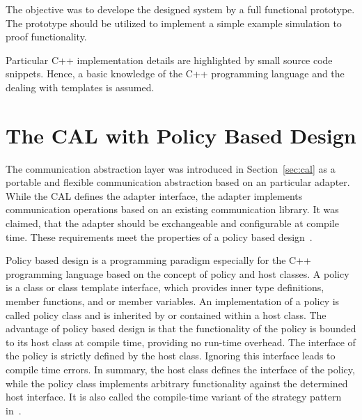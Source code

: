 The objective was to develope the designed system by a full functional prototype.
The prototype should be utilized to implement a simple example simulation
to proof functionality. 

Particular C++ implementation details are highlighted by small source
code snippets. Hence, a basic knowledge of the C++ programming
language and the dealing with templates is assumed.

\section{The CAL with Policy Based Design}

The communication abstraction layer was introduced in
Section~\ref{sec:cal} as a portable and flexible communication
abstraction based on an particular adapter. While the CAL defines the
adapter interface, the adapter implements communication operations
based on an existing communication library.  It was claimed, that the
adapter should be exchangeable and configurable at compile time. These
requirements meet the properties of a policy based
design~\cite{ref:policy_based_design}.

Policy based design is a programming paradigm especially for the C++
programming language based on the concept of policy and host classes.
A policy is a class or class template interface, which provides inner
type definitions, member functions, and or member variables. An
implementation of a policy is called policy class and is inherited by
or contained within a host class.  The advantage of policy based
design is that the functionality of the policy is bounded to its host
class at compile time, providing no run-time overhead.  The interface
of the policy is strictly defined by the host class. Ignoring this
interface leads to compile time errors. In summary, the host class
defines the interface of the policy, while the policy class implements
arbitrary functionality against the determined host interface. It is
also called the compile-time variant of the strategy pattern
in~\cite{ref:policy_strategy}.

